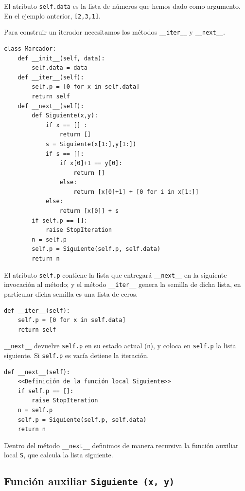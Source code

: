 \documentclass[10pt,a4paper]{report}
\begin{document}
El atributo \texttt{self.data} es la lista de números que hemos dado como argumento. En el ejemplo anterior, \texttt{[2,3,1]}.

Para construir un iterador necesitamos los métodos \texttt{\_\_iter\_\_} y \texttt{\_\_next\_\_}.

\begin{verbatim}
class Marcador:
    def __init__(self, data):
        self.data = data
    def __iter__(self):
        self.p = [0 for x in self.data]
        return self                                
    def __next__(self):
        def Siguiente(x,y):
            if x == [] :
                return []    
            s = Siguiente(x[1:],y[1:])
            if s == []:
                if x[0]+1 == y[0]:
                    return []
                else:
                    return [x[0]+1] + [0 for i in x[1:]]
            else:
                return [x[0]] + s
        if self.p == []:
            raise StopIteration                         
        n = self.p
        self.p = Siguiente(self.p, self.data)
        return n

\end{verbatim}

El atributo \texttt{self.p} contiene la lista que entregará \texttt{\_\_next\_\_} en la siguiente invocación al método; y el método \texttt{\_\_iter\_\_} genera la semilla de dicha lista, en particular dicha semilla es una lista de ceros.
\begin{verbatim}
def __iter__(self):
    self.p = [0 for x in self.data]
    return self
\end{verbatim}

\texttt{\_\_next\_\_} devuelve \texttt{self.p} en su estado actual (\texttt{n}), y coloca en \texttt{self.p} la lista siguiente. Si \texttt{self.p} es vacía detiene la iteración.
\begin{verbatim}
def __next__(self):
    <<Definición de la función local Siguiente>>
    if self.p == []:
        raise StopIteration                         
    n = self.p
    self.p = Siguiente(self.p, self.data)
    return n
\end{verbatim}

Dentro del método \texttt{\_\_next\_\_} definimos de manera recursiva la función auxiliar local \texttt{S}, que calcula la lista siguiente.
\subsection{Función auxiliar \texttt{Siguiente (x, y)}}
\label{sec:org8f15c78}
\end{document}
